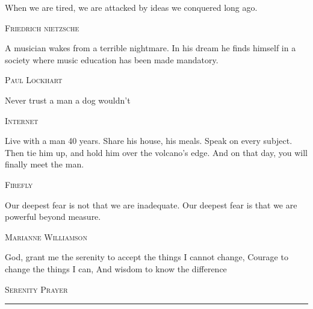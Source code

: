 \begin{titlepage}

\noindent
\par


\epigraph{When we are tired, we are attacked 
by ideas we conquered long ago.}
    {\textsc{Friedrich nietzsche}}
\epigraph{ A musician wakes from a terrible nightmare. In his dream he finds
himself in a society where music education has been made mandatory.}
    {\textsc{Paul Lockhart}}
\epigraph{Never trust a man a dog wouldn't}
    {\textsc{Internet}}
\epigraph{Live with a man 40 years. Share his house, his meals. Speak on every subject. Then tie him up, and hold him over the volcano's edge. And on that day, you will finally meet the man.}
    {\textsc{Firefly}}
\epigraph{Our deepest fear is not that we are inadequate.
Our deepest fear is that we are powerful beyond measure.}
    {\textsc{Marianne Williamson}}
\epigraph{God, grant me the serenity to accept the things I cannot change,
\newline Courage to change the things I can,\newline
And wisdom to know the difference}
    {\textsc{Serenity Prayer}}


\null\vfill
\vspace*{1cm}
\noindent
\hfill
\begin{minipage}{0.35\linewidth}
    \begin{flushright}
        \printauthor%
    \end{flushright}
\end{minipage}
%
\begin{minipage}{0.02\linewidth}
    \rule{1pt}{125pt}
\end{minipage}
\titlepagedecoration%
\end{titlepage}
